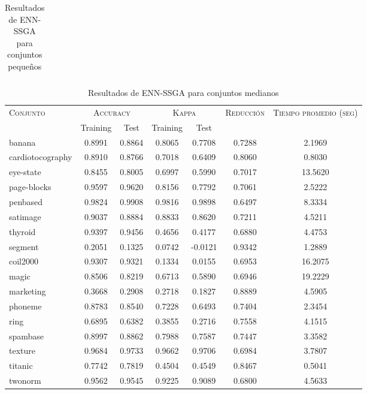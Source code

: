 \begin{table}[]
\begin{tabular}{l c c c c c c}
\hline
\end{tabular}
\caption{Resultados de ENN-SSGA para conjuntos pequeños }
\label{res-peq-enn-ssga}
\end{table}


\begin{table}[]
\centering
\begin{tabular}{l c c c c c c}
\hline
\multirow{2}{*}{\textsc{Conjunto}}
	& \multicolumn{2}{c}{\textsc{Accuracy}}
	& \multicolumn{2}{c}{\textsc{Kappa}}
	& \textsc{Reducción}
	& \textsc{Tiempo promedio (seg)} \\
	& Training & Test
	& Training & Test \\ 
\hline
\hline

banana & 0.8991 & 0.8864 & 0.8065 & 0.7708 & 0.7288 & 2.1969 \\
cardiotocography & 0.8910 & 0.8766 & 0.7018 & 0.6409 & 0.8060 & 0.8030 \\
eye-state & 0.8455 & 0.8005 & 0.6997 & 0.5990 & 0.7017 & 13.5620 \\
page-blocks & 0.9597 & 0.9620 & 0.8156 & 0.7792 & 0.7061 & 2.5222 \\
penbased & 0.9824 & 0.9908 & 0.9816 & 0.9898 & 0.6497 & 8.3334 \\
satimage & 0.9037 & 0.8884 & 0.8833 & 0.8620 & 0.7211 & 4.5211 \\
thyroid & 0.9397 & 0.9456 & 0.4656 & 0.4177 & 0.6880 & 4.4753 \\
segment & 0.2051 & 0.1325 & 0.0742 & -0.0121 & 0.9342 & 1.2889 \\
coil2000 & 0.9307 & 0.9321 & 0.1334 & 0.0155 & 0.6953 & 16.2075 \\
magic & 0.8506 & 0.8219 & 0.6713 & 0.5890 & 0.6946 & 19.2229 \\
marketing & 0.3668 & 0.2908 & 0.2718 & 0.1827 & 0.8889 & 4.5905 \\
phoneme & 0.8783 & 0.8540 & 0.7228 & 0.6493 & 0.7404 & 2.3454 \\
ring & 0.6895 & 0.6382 & 0.3855 & 0.2716 & 0.7558 & 4.1515 \\
spambase & 0.8997 & 0.8862 & 0.7988 & 0.7587 & 0.7447 & 3.3582 \\
texture & 0.9684 & 0.9733 & 0.9662 & 0.9706 & 0.6984 & 3.7807 \\
titanic & 0.7742 & 0.7819 & 0.4504 & 0.4549 & 0.8467 & 0.5041 \\
twonorm & 0.9562 & 0.9545 & 0.9225 & 0.9089 & 0.6800 & 4.5633 \\

\hline
\end{tabular}
\caption{Resultados de ENN-SSGA para conjuntos medianos }
\label{res-med-enn-ssga}
\end{table}



